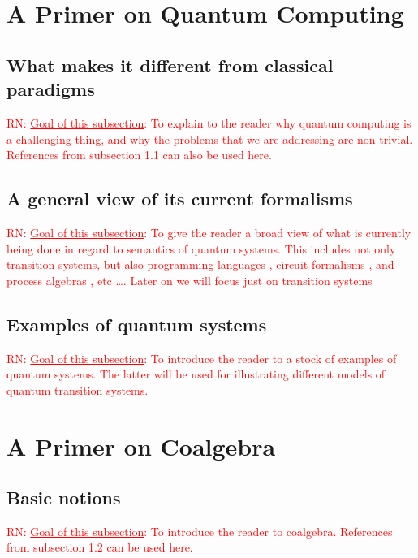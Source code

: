 \documentclass[a4paper, 11pt]{article}
\newcommand{\nevComment}[1]{\textcolor{red}{RN: #1}}
\begin{document}
\section{A Primer on Quantum Computing}

\subsection{What makes it different from classical paradigms}

\nevComment{\underline{Goal of this subsection}: To explain to the
reader why quantum computing is a challenging thing, and why the
problems that we are addressing are non-trivial. References from
subsection 1.1 can also be used here. }

\subsection{A general view of its current formalisms}

\nevComment{\underline{Goal of this subsection}: To give the reader a
  broad view of what is currently being done in regard to semantics of
  quantum systems. This includes not only transition systems, but also
  programming languages \cite{selinger04,hasuo17,ying16}, circuit
  formalisms \cite{nielsen2002quantum}, and process algebras
  \cite{jorrand04,ying09}, etc \dots. Later on we will focus just on transition
  systems}

\subsection{Examples of quantum systems}

\nevComment{\underline{Goal of this subsection}: To introduce the reader
to a stock of examples of quantum systems. The latter will be used
for illustrating different models of quantum transition systems.}

\section{A Primer on Coalgebra}

\subsection{Basic notions}

\nevComment{\underline{Goal of this subsection}: To introduce the reader
to coalgebra. References from subsection 1.2 can be used here.}
\end{document}
